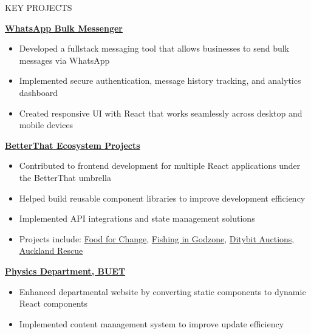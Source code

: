 \documentclass{resume} %
\begin{document}
\begin{rSection}{KEY PROJECTS}
\item \textbf{\href{https://github.com/rafidrahman1/whatsapp.git}{WhatsApp Bulk Messenger}}
\begin{itemize}
    \itemsep -3pt {}
    \item Developed a fullstack messaging tool that allows businesses to send bulk messages via WhatsApp
    \item Implemented secure authentication, message history tracking, and analytics dashboard
    \item Created responsive UI with React that works seamlessly across desktop and mobile devices
\end{itemize}

\item \textbf{\href{https://betterthat.com/}{BetterThat Ecosystem Projects}}
\begin{itemize}
    \itemsep -3pt {}
    \item Contributed to frontend development for multiple React applications under the BetterThat umbrella
    \item Helped build reusable component libraries to improve development efficiency
    \item Implemented API integrations and state management solutions
    \item Projects include: \href{https://ffc.betterthatconnect.com/}{Food for Change}, \href{https://fig.betterthatconnect.com/}{Fishing in Godzone}, \href{https://ditybit.com/}{Ditybit Auctions}, \href{https://ar.betterthatconnect.com/}{Auckland Rescue}
\end{itemize}

\item \textbf{\href{https://phy.buet.ac.bd/}{Physics Department, BUET}}
\begin{itemize}
    \itemsep -3pt {}
    \item Enhanced departmental website by converting static components to dynamic React components
    \item Implemented content management system to improve update efficiency
\end{itemize}
\end{rSection}

\end{document}
